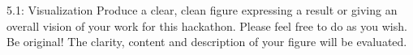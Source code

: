 \documentclass [a4paper, 12pt] {article}
\begin{document}
\begin{question}{5.1: Visualization}
Produce a clear, clean figure expressing a result or giving an overall vision of your work for this hackathon. Please feel free to do as you wish. Be original! The clarity, content and description of your figure will be evaluated.
\end{question}
\begin{answer}\color{blue}
\end{answer}

\clearpage
\end{document}
